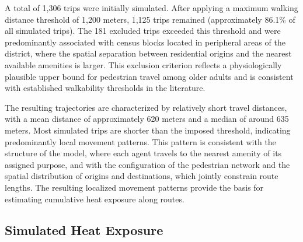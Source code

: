 \documentclass{wscpaperproc}
\theoremstyle{wsc}
\begin{document}
A total of 1,306 trips were initially simulated. After applying a maximum walking distance threshold of 1,200 meters, 1,125 trips remained (approximately 86.1\% of all simulated trips). The 181 excluded trips exceeded this threshold and were predominantly associated with census blocks located in peripheral areas of the district, where the spatial separation between residential origins and the nearest available amenities is larger. This exclusion criterion reflects a physiologically plausible upper bound for pedestrian travel among older adults and is consistent with established walkability thresholds in the literature.


The resulting trajectories are characterized by relatively short travel distances, with a mean distance of approximately 620 meters and a median of around 635 meters. Most simulated trips are shorter than the imposed threshold, indicating predominantly local movement patterns.
This pattern is consistent with the structure of the model, where each agent travels to the nearest amenity of its assigned purpose, and with the configuration of the pedestrian network and the spatial distribution of origins and destinations, which jointly constrain route lengths. The resulting localized movement patterns provide the basis for estimating cumulative heat exposure along routes.

\subsection{Simulated Heat Exposure}

\end{document}

